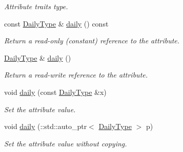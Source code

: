 \begin{DoxyCompactItemize}
\begin{DoxyCompactList}\small\item\em Attribute traits type. \item\end{DoxyCompactList}\item 
const \hyperlink{classopenstack_1_1xml_1_1DailyBackup}{DailyType} \& \hyperlink{classopenstack_1_1xml_1_1BackupSchedule_a1d15ed481ff1c448df964432d5dd0704}{daily} () const 
\begin{DoxyCompactList}\small\item\em Return a read-\/only (constant) reference to the attribute. \item\end{DoxyCompactList}\item 
\hyperlink{classopenstack_1_1xml_1_1DailyBackup}{DailyType} \& \hyperlink{classopenstack_1_1xml_1_1BackupSchedule_a3643e91d4327238705853b7d2f8f50c4}{daily} ()
\begin{DoxyCompactList}\small\item\em Return a read-\/write reference to the attribute. \item\end{DoxyCompactList}\item 
void \hyperlink{classopenstack_1_1xml_1_1BackupSchedule_a4eb90fb16864741be4af4d6366e80d7f}{daily} (const \hyperlink{classopenstack_1_1xml_1_1DailyBackup}{DailyType} \&x)
\begin{DoxyCompactList}\small\item\em Set the attribute value. \item\end{DoxyCompactList}\item 
void \hyperlink{classopenstack_1_1xml_1_1BackupSchedule_ac099f96e7b48c645f4206dec3602df3d}{daily} (::std::auto\_\-ptr$<$ \hyperlink{classopenstack_1_1xml_1_1DailyBackup}{DailyType} $>$ p)
\begin{DoxyCompactList}\small\item\em Set the attribute value without copying. \item\end{DoxyCompactList}\end{DoxyCompactItemize}
